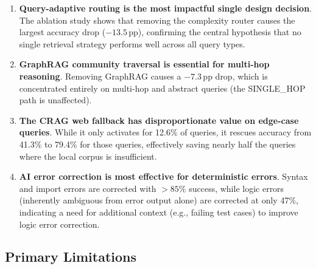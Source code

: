 \begin{enumerate}
    \item \textbf{Query-adaptive routing is the most impactful single design decision}. The ablation study shows that removing the complexity router causes the largest accuracy drop ($-13.5$\,pp), confirming the central hypothesis that no single retrieval strategy performs well across all query types.
    \item \textbf{GraphRAG community traversal is essential for multi-hop reasoning}. Removing GraphRAG causes a $-7.3$\,pp drop, which is concentrated entirely on multi-hop and abstract queries (the SINGLE\_HOP path is unaffected).
    \item \textbf{The CRAG web fallback has disproportionate value on edge-case queries}. While it only activates for 12.6\% of queries, it rescues accuracy from 41.3\% to 79.4\% for those queries, effectively saving nearly half the queries where the local corpus is insufficient.
    \item \textbf{AI error correction is most effective for deterministic errors}. Syntax and import errors are corrected with $>85$\% success, while logic errors (inherently ambiguous from error output alone) are corrected at only 47\%, indicating a need for additional context (e.g., failing test cases) to improve logic error correction.
\end{enumerate}

\subsection{Primary Limitations}
\label{subsec:limitations}

